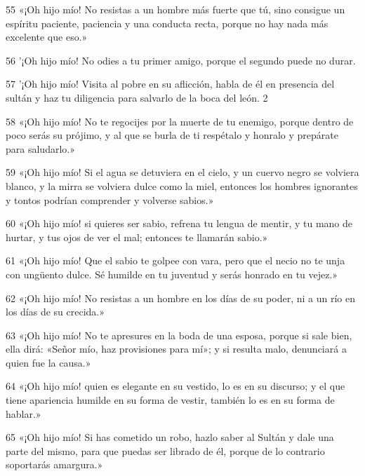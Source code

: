 \par 55 «¡Oh hijo mío! No resistas a un hombre más fuerte que tú, sino consigue un espíritu paciente, paciencia y una conducta recta, porque no hay nada más excelente que eso.»

\par 56 '¡Oh hijo mío! No odies a tu primer amigo, porque el segundo puede no durar.

\par 57 '¡Oh hijo mío! Visita al pobre en su aflicción, habla de él en presencia del sultán y haz tu diligencia para salvarlo de la boca del león. 2

\par 58 «¡Oh hijo mío! No te regocijes por la muerte de tu enemigo, porque dentro de poco serás su prójimo, y al que se burla de ti respétalo y honralo y prepárate para saludarlo.»

\par 59 «¡Oh hijo mío! Si el agua se detuviera en el cielo, y un cuervo negro se volviera blanco, y la mirra se volviera dulce como la miel, entonces los hombres ignorantes y tontos podrían comprender y volverse sabios.»

\par 60 «¡Oh hijo mío! si quieres ser sabio, refrena tu lengua de mentir, y tu mano de hurtar, y tus ojos de ver el mal; entonces te llamarán sabio.»

\par 61 «¡Oh hijo mío! Que el sabio te golpee con vara, pero que el necio no te unja con ungüento dulce. Sé humilde en tu juventud y serás honrado en tu vejez.»

\par 62 «¡Oh hijo mío! No resistas a un hombre en los días de su poder, ni a un río en los días de su crecida.»

\par 63 «¡Oh hijo mío! No te apresures en la boda de una esposa, porque si sale bien, ella dirá: «Señor mío, haz provisiones para mí»; y si resulta malo, denunciará a quien fue la causa.»

\par 64 «¡Oh hijo mío! quien es elegante en su vestido, lo es en su discurso; y el que tiene apariencia humilde en su forma de vestir, también lo es en su forma de hablar.»

\par 65 «¡Oh hijo mío! Si has cometido un robo, hazlo saber al Sultán y dale una parte del mismo, para que puedas ser librado de él, porque de lo contrario soportarás amargura.»

